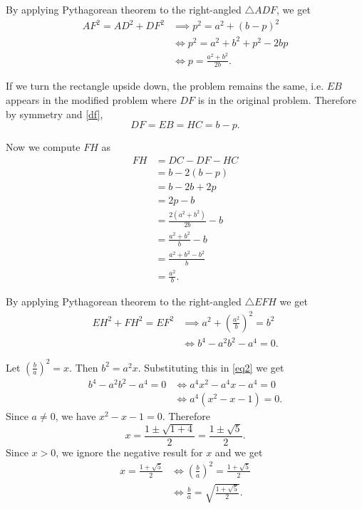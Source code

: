 \documentclass{article}
\begin{document}
By applying Pythagorean theorem to the right-angled \( \triangle ADF \),
we get
\begin{align*}
AF^2 = AD^2 + DF^2
& \implies p^2  = a^2 + (b - p)^2 \\
& \iff     p^2  = a^2 + b^2 + p^2 - 2bp \\
& \iff     p    = \frac{a^2 + b^2}{2b}.
\end{align*}

If we turn the rectangle upside down, the problem remains the same, i.e.
\( EB \) appears in the modified problem where \( DF \) is in the
original problem. Therefore by symmetry and \eqref{df},
\[
DF = EB = HC = b - p.
\]

Now we compute \( FH \) as
\begin{align*}
FH & = DC - DF - HC \\
   & = b - 2(b - p) \\
   & = b - 2b + 2p \\
   & = 2p - b \\
   & = \frac{2 \left( a^2 + b^2 \right)}{2b} - b \\
   & = \frac{a^2 + b^2}{b} - b \\
   & = \frac{a^2 + b^2 - b^2}{b} \\
   & = \frac{a^2}{b}.
\end{align*}

By applying Pythagorean theorem to the right-angled \( \triangle EFH \)
we get
\begin{align}
EH^2 + FH^2 = EF^2 & \implies a^2 + \left( \frac{a^2}{b} \right)^2 = b^2
                     \nonumber \\
                   & \iff b^4 - a^2 b^2 - a^4 = 0.
                     \label{eq2}
\end{align}

Let \( \left( \frac{b}{a} \right)^2 = x \). Then \( b^2 = a^2 x \).
Substituting this in \eqref{eq2} we get
\begin{align*}
b^4 - a^2 b^2 - a^4 = 0 & \iff a^4 x^2 - a^4 x - a^4 = 0 \\
                        & \iff a^4 (x^2 - x - 1) = 0.
\end{align*}
Since \( a \neq 0 \), we have \( x^2 - x - 1 = 0 \). Therefore
\[
x = \frac{1 \pm \sqrt{1 + 4}}{2} = \frac{1 \pm \sqrt{5}}{2}.
\]
Since \( x > 0 \), we ignore the negative result for \( x \) and we get
\begin{align*}
x = \frac{1 + \sqrt{5}}{2}
& \iff \left( \frac{b}{a} \right)^2 = \frac{1 + \sqrt{5}}{2} \\
& \iff \frac{b}{a} = \sqrt{\frac{1 + \sqrt{5}}{2}}.
\end{align*}
\end{document}
